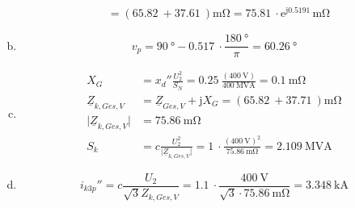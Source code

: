 ﻿\documentclass[a4paper,11pt]{scrartcl}
\newcommand{\mybr}[1]{\left(#1\right)}
\renewcommand{\j}{\mathrm{j}}
\newcommand{\e}{\mathrm{e}}
\newcommand{\Z}{\underline{Z}}
\newcommand{\0}{_{\mybr{0}}}
\newcommand{\1}{_{\mybr{1}}}
\newcommand{\2}{_{\mybr{2}}}
\begin{document}
\begin{enumerate}[a)]
\begin{align}
&=\mybr{\SI{65,82}{}+\SI{37,61}{}}\si{\milli\ohm}=\SI{75,81}{}\cdot\e^{\j\SI{0,5191}{}}\si{\milli\ohm}
\end{align}
\item
\begin{equation}
v_p=\SI{90}{\degree}-\SI{0,517}{}\cdot\frac{\SI{180}{\degree}}{\pi}=\SI{60,26}{\degree}
\end{equation}
\item
\begin{align}
X_G&=x_d''\frac{U_2^2}{S_N}=\SI{0,25}{}\frac{\mybr{\SI{400}{\volt}}}{\SI{400}{\mega\volt\ampere}}=\SI{0,1}{\milli\ohm}\\
\Z_{k,Ges,V}&=\Z_{Ges,V}+\j X_G=\mybr{\SI{65,82}{}+\SI{37,71}{}}\si{\milli\ohm}\\
\vert\Z_{k,Ges,V}\vert&=\SI{75,86}{\milli\ohm}\\
S_k&=c\frac{U_2^2}{\vert\Z_{k,Ges,V}\vert}=\SI{1}{}\cdot\frac{\mybr{\SI{400}{\volt}}^2}{\SI{75,86}{\milli\ohm}}=\SI{2,109}{\mega\volt\ampere}
\end{align}
\item
\begin{equation}
i_{k3p}''=c\frac{U_2}{\sqrt{3}Z_{k,Ges,V}}=\SI{1,1}{}\cdot\frac{\SI{400}{\volt}}{\sqrt{3}\cdot\SI{75,86}{\milli\ohm}}=\SI{3,348}{\kilo\ampere}
\end{equation}
\end{enumerate}
\end{document}
